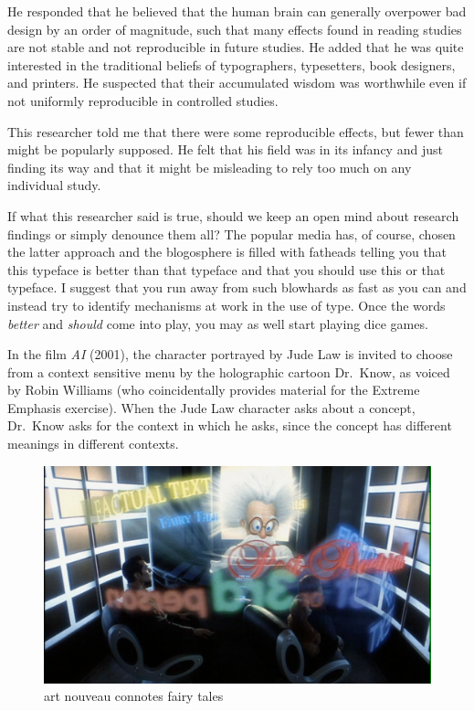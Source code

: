 He responded that he believed that the human brain can generally
overpower bad design by an order of magnitude, such that many effects
found in reading studies are not stable and not reproducible in future
studies. He added that he was quite interested in the traditional
beliefs of typographers, typesetters, book designers, and printers. He
suspected that their accumulated wisdom was worthwhile even if not
uniformly reproducible in controlled studies.

This researcher told me that there were some reproducible effects, but
fewer than might be popularly supposed. He felt that his field was in
its infancy and just finding its way and that it might be misleading to
rely too much on any individual study.

If what this researcher said is true, should we keep an open mind about
research findings or simply denounce them all? The popular media has, of
course, chosen the latter approach and the blogosphere is filled with
fatheads telling you that this typeface is better than that typeface and
that you should use this or that typeface. I suggest that you run away
from such blowhards as fast as you can and instead try to identify
mechanisms at work in the use of type. Once the words \emph{better} and
\emph{should} come into play, you may as well start playing dice games.

\hypertarget{type-in-a-menu}{%
\label{type-in-a-menu}}

In the film \emph{AI} (2001), the character portrayed by Jude Law is
invited to choose from a context sensitive menu by the holographic
cartoon Dr.~Know, as voiced by Robin Williams (who coincidentally
provides material for the Extreme Emphasis exercise). When the Jude Law
character asks about a concept, Dr.~Know asks for the context in which
he asks, since the concept has different meanings in different contexts.

\begin{figure}
\centering
\includegraphics{./fiDrKnowMenu1.pdf}
\caption{art nouveau connotes fairy tales}
\end{figure}

